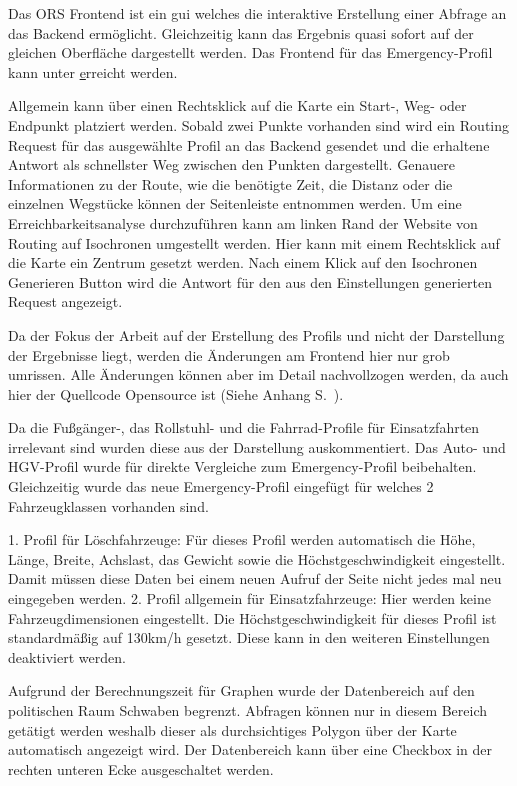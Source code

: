 Das ORS Frontend ist ein \gls{gui} welches die interaktive Erstellung einer Abfrage an das Backend ermöglicht.
Gleichzeitig kann das Ergebnis quasi sofort auf der gleichen Oberfläche dargestellt werden.
Das Frontend für das Emergency-Profil kann unter \href{www.emergency.openrouteservice.org} erreicht werden.

\bigskip

Allgemein kann über einen Rechtsklick auf die Karte ein Start-, Weg- oder Endpunkt platziert werden.
Sobald zwei Punkte vorhanden sind wird ein Routing Request für das ausgewählte Profil an das Backend gesendet und die erhaltene Antwort als schnellster Weg zwischen den Punkten dargestellt.
Genauere Informationen zu der Route, wie die benötigte Zeit, die Distanz oder die einzelnen Wegstücke können der Seitenleiste entnommen werden.
Um eine Erreichbarkeitsanalyse durchzuführen kann am linken Rand der Website von Routing auf Isochronen umgestellt werden.
Hier kann mit einem Rechtsklick auf die Karte ein Zentrum gesetzt werden.
Nach einem Klick auf den Isochronen Generieren Button wird die Antwort für den aus den Einstellungen generierten Request angezeigt.

\bigskip

Da der Fokus der Arbeit auf der Erstellung des Profils und nicht der Darstellung der Ergebnisse liegt, werden die Änderungen am Frontend hier nur grob umrissen.
Alle Änderungen können aber im Detail nachvollzogen werden, da auch hier der Quellcode Opensource ist (Siehe Anhang S.~\pageref{sec:anhang}).

\bigskip

Da die Fußgänger-, das Rollstuhl- und die Fahrrad-Profile für Einsatzfahrten irrelevant sind wurden diese aus der Darstellung auskommentiert.
Das Auto- und HGV-Profil wurde für direkte Vergleiche zum Emergency-Profil beibehalten.
Gleichzeitig wurde das neue Emergency-Profil eingefügt für welches 2 Fahrzeugklassen vorhanden sind.

\bigskip

1. Profil für Löschfahrzeuge: Für dieses Profil werden automatisch die Höhe, Länge, Breite, Achslast, das Gewicht sowie die Höchstgeschwindigkeit eingestellt.
Damit müssen diese Daten bei einem neuen Aufruf der Seite nicht jedes mal neu eingegeben werden.
2. Profil allgemein für Einsatzfahrzeuge: Hier werden keine Fahrzeugdimensionen eingestellt.
Die Höchstgeschwindigkeit für dieses Profil ist standardmäßig auf 130km/h gesetzt.
Diese kann in den weiteren Einstellungen deaktiviert werden.

\bigskip

Aufgrund der Berechnungszeit für Graphen wurde der Datenbereich auf den politischen Raum Schwaben begrenzt.
Abfragen können nur in diesem Bereich getätigt werden weshalb dieser als durchsichtiges Polygon über der Karte automatisch angezeigt wird.
Der Datenbereich kann über eine Checkbox in der rechten unteren Ecke ausgeschaltet werden.
